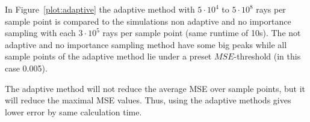 In Figure~\ref{plot:adaptive} the adaptive method with 
$5 \cdot 10^4$ to $5 \cdot 10^8$ rays per sample point is compared to the simulations
non adaptive and no importance sampling with each $3 \cdot 10^5$ rays per sample point (same runtime of 10s).
The not adaptive and no importance sampling method have some big peaks while all sample points of 
the adaptive method lie under a preset $MSE$-threshold (in this case 0.005). 

The adaptive method will not reduce the average MSE over sample points,
but it will reduce the maximal MSE values. Thus, using the adaptive
methods gives lower error by same calculation time.


